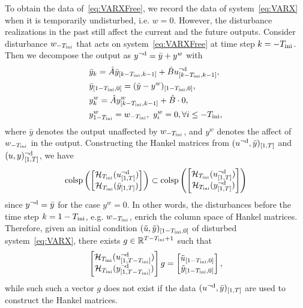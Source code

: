 To obtain the data of~\eqref{eq:VARXFree}, we record the data of system~\eqref{eq:VARX} when it is temporarily undisturbed, i.e. $w=0$. However, the disturbance realizations in the past still affect the current and the future outputs. Consider disturbance $w_{-T_\text{ini}}$ that acts on system~\eqref{eq:VARXFree} at time step $k=-T_\text{ini}$. Then we decompose the output as $y^{\neg\mathrm{d}} = \bar{y} + y^w$ with
\begin{align*} 
		&\bar{y}_k = \hat{A}\bar{y}_{[k-T_\text{ini},k-1]} + \hat{B}u_{[k-T_\text{ini},k-1]}^{\neg\mathrm{d}},\\
		&\bar{y}_{[1-T_\text{ini},0]} = (\tilde{y}-y^w)_{[1-T_\text{ini},0]},\\
		&y^w_k = \hat{A}y^w_{[k-T_\text{ini},k-1]} + \hat{B}\cdot 0,\\
		& y^w_{1-T_\text{ini}} = w_{-T_\text{ini}},~y^w_{i} = 0, \forall i \leq -T_\text{ini},
\end{align*}
where $\bar{y}$ denotes the output unaffected by $w_{-T_\text{ini}}$, and $y^w$ denotes the affect of $w_{-T_\text{ini}}$ in the output. Constructing the Hankel matrices from $(u^{\neg\mathrm{d}},\bar{y})_{[1,T]}$ and $(u,y)_{[1,T]}^{\neg\mathrm{d}}$, we have
\[
	\mathrm{colsp}\left( \begin{bmatrix} \mathcal{H}_{T_\text{ini}}(u_{[1,T]}^{\neg\mathrm{d}})\\ \mathcal{H}_{T_\text{ini}}(\bar{y}_{[1,T]}) \end{bmatrix}\right)\subset \mathrm{colsp}\left( \begin{bmatrix} \mathcal{H}_{T_\text{ini}}(u_{[1,T]}^{\neg\mathrm{d}})\\ \mathcal{H}_{T_\text{ini}}(y_{[1,T]}^{\neg\mathrm{d}}) \end{bmatrix}\right)
\]
since $y^{\neg\mathrm{d}}=\bar{y}$ for the case $y^w=0$.
In other words, the disturbances before the time step $k=1-T_\text{ini}$, e.g. $w_{-T_\text{ini}}$, enrich the column space of Hankel matrices. Therefore, given an initial condition $(\tilde{u},\tilde{y})_{[1-T_\text{ini},0]}$ of disturbed system~\eqref{eq:VARX}, there exists $g\in\mathbb{R}^{T-T_\text{ini}+1}$ such that
\[
	\begin{bmatrix}
		\mathcal{H}_{T_\text{ini}}(u_{[1,T-T_\text{ini}]}^{\neg\mathrm{d}})\\
		\mathcal{H}_{T_\text{ini}}(y_{[1,T-T_\text{ini}]}^{\neg\mathrm{d}})
	\end{bmatrix} g = 
	\begin{bmatrix}
		\tilde{u}_{[1-T_\text{ini},0]}\\
		\tilde{y}_{[1-T_\text{ini},0]} 
	\end{bmatrix},
\]
while such such a vector $g$ does not exist if the data $(u^{\neg\mathrm{d}},\bar{y})_{[1,T]}$ are used to construct the Hankel matrices.
